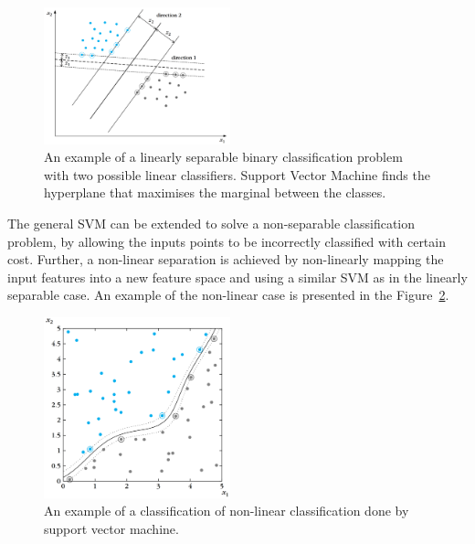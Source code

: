 \begin{figure}[H]
\centering
\includegraphics[width=0.48\textwidth]{images/support-vector-machine-linear.pdf}
\caption{An example of a linearly separable binary classification problem with two possible linear classifiers. Support Vector Machine finds the hyperplane that maximises the marginal between the classes.~\cite{theodoridis:2009:pattern-recognition}}
\label{fig:support-vector-machine-linear}
\end{figure}

The general SVM can be extended to solve a non-separable classification problem, by allowing the inputs points to be incorrectly classified with certain cost. Further, a non-linear separation is achieved by non-linearly mapping the input features into a new feature space and using a similar SVM as in the linearly separable case. An example of the non-linear case is presented in the Figure~\ref{fig:support-vector-machine-linear-non-linear}.~\cite{theodoridis:2009:pattern-recognition}

\begin{figure}[H]
\centering
\includegraphics[width=0.48\textwidth]{images/support-vector-machine-non-linear.pdf}
\caption{An example of a classification of non-linear classification done by support vector machine.~\cite{theodoridis:2009:pattern-recognition}}
\label{fig:support-vector-machine-linear-non-linear}
\end{figure}

